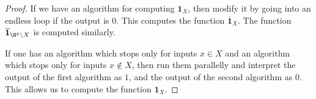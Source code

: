 

\setcounter{section}{3}
\setcounter{subsection}{4}
\setcounter{dfn}{29}

\begin{proof}
If we have an algorithm for computing $\mathbf{1}_X$, then modify it by going into an endless loop if the output is $0$.
This computes the function $\overline{\mathbf{1}}_X$. The function $\overline{\mathbf{1}}_{\N^p \setminus X}$ is computed similarly.

If one has an algorithm which stops only for inputs $x \in X$ and an algorithm which stops only for inputs $x \notin X$, then run them parallelly
and interpret the output of the first algorithm as $1$, and the output of the second algorithm as $0$.
This allows us to compute the function $\mathbf{1}_X$.
\end{proof}



